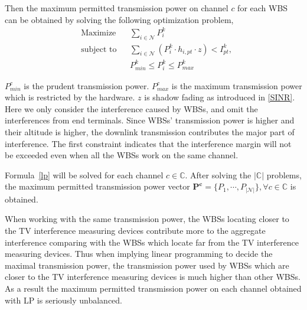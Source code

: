 \documentclass[times]{ettauth}
\theoremstyle{mytheoremstyle}
\theoremstyle{mytheoremstyle}
\theoremstyle{mytheoremstyle}
\begin{document}
Then the maximum permitted transmission power on channel $c$ for each WBS can be obtained by solving the following optimization problem,
	\begin{equation}
\label{lp}
		\begin{aligned}
		& {\text{Maximize}}
		& & \sum_{i\in \mathcal{N}} P^k_i \\
		& \text{subject to}
		& & \sum_{i\in \mathcal{N}} (P^k_i \cdot h_{i,pt}\cdot z) < I^k_{pt},\\
		& & & P_{min}^k \leq P_i^k \leq P_{max}^k
		\end{aligned}
	\end{equation}
	

$P_{min}^c$ is the prudent transmission power. %
$P_{max}^c$ is the maximum transmission power which is restricted by the hardware.
$z$ is shadow fading as introduced in \ref{SINR}.
Here we only consider the interference caused by WBSs, and omit the interferences from end terminals. 
Since WBSs' transmission power is higher and their altitude is higher\cite{multipleIntf_pimrc11}, the downlink transmission contributes the major part of interference\cite{infmitigate07mobicom}.
The first constraint indicates that the interference margin will not be exceeded even when all the WBSs work on the same channel.


Formula~\ref{lp} will be solved for each channel $c\in \mathbb{C}$.
After solving the $|\mathbb{C}|$ problems, the maximum permitted transmission power vector $\bm{P^c} =\{P_1,\cdots,P_{|\mathcal{N}|}\}, \forall c\in \mathbb{C}$ is obtained.

When working with the same transmission power, the WBSs locating closer to the TV interference measuring devices contribute more to the aggregate interference comparing with the WBSs which locate far from the TV interference measuring devices.
Thus when implying linear programming to decide the maximal transmission power, the transmission power used by WBSs which are closer to the TV interference measuring devices is much higher than other WBSs.
As a result the maximum permitted transmission power on each channel obtained with LP is seriously unbalanced.
\end{document}
